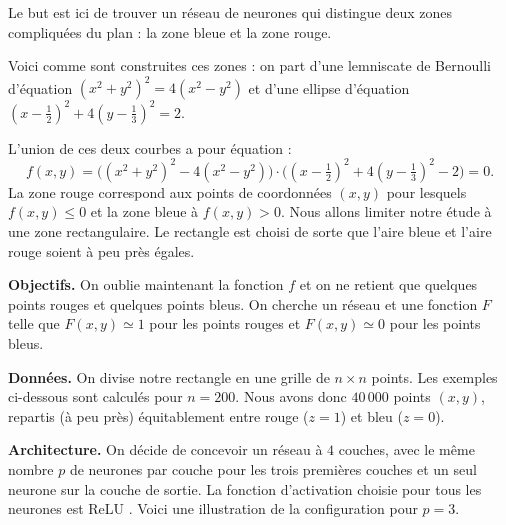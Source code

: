 Le but est ici de trouver un réseau de neurones qui distingue deux zones compliquées du plan : la zone bleue et la zone rouge.




Voici comme sont construites ces zones : on part d'une lemniscate de Bernoulli d'équation $(x^2+y^2)^2 = 4(x^2-y^2)$ et d'une ellipse d'équation
$(x-\frac12)^2 + 4(y-\frac13)^2=2$. 

\begin{center}
	\begin{minipage}{0.31\textwidth}
	\end{minipage}
	\quad
	\begin{minipage}{0.31\textwidth}
		
	\end{minipage}
	\quad
	\begin{minipage}{0.31\textwidth}
	\end{minipage}
\end{center}


L'union de ces deux courbes a pour équation :
$$f(x,y) = \big( (x^2+y^2)^2 - 4(x^2-y^2) \big)  \cdot \big((x-\tfrac12)^2 + 4(y-\tfrac13)^2 - 2 \big) = 0.$$
La zone rouge correspond aux points de coordonnées $(x,y)$ pour lesquels $f(x,y) \le 0$ et la zone bleue à $f(x,y) > 0$. Nous allons limiter notre étude à une zone rectangulaire. Le rectangle est choisi de sorte que l'aire bleue et l'aire rouge soient à peu près égales.

\textbf{Objectifs.} 
On oublie maintenant la fonction $f$ et on ne retient que quelques points rouges et quelques points bleus. On cherche un réseau et une fonction $F$ telle que $F(x,y) \simeq 1$ pour les points rouges et $F(x,y) \simeq 0$ pour les points bleus.

\textbf{Données.} 
On divise notre rectangle en une grille de $n \times n$ points. Les exemples ci-dessous sont calculés pour $n=200$. Nous avons donc $40\,000$ points $(x,y)$, repartis (à peu près) équitablement entre rouge ($z=1$) et bleu ($z=0$).

\textbf{Architecture.}
On décide de concevoir un réseau à $4$ couches, avec le même nombre $p$ de neurones par couche pour les trois premières couches et un seul neurone sur la couche de sortie. La fonction d'activation choisie pour tous les neurones est ReLU .
Voici une illustration de la configuration pour $p=3$.

